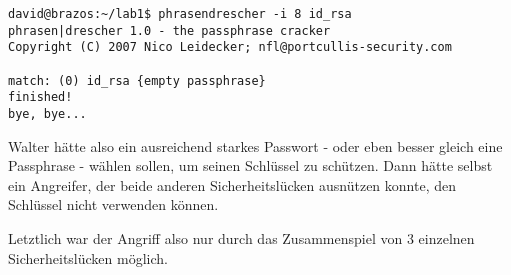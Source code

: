 \begin{lstlisting}
david@brazos:~/lab1$ phrasendrescher -i 8 id_rsa
phrasen|drescher 1.0 - the passphrase cracker
Copyright (C) 2007 Nico Leidecker; nfl@portcullis-security.com

match: (0) id_rsa {empty passphrase}
finished!
bye, bye...
\end{lstlisting}

Walter hätte also ein ausreichend starkes Passwort - oder eben besser gleich eine Passphrase - wählen sollen, um seinen Schlüssel zu schützen. Dann hätte selbst ein Angreifer, der beide anderen Sicherheitslücken ausnützen konnte, den Schlüssel nicht verwenden können.

Letztlich war der Angriff also nur durch das Zusammenspiel von 3 einzelnen Sicherheitslücken möglich.

